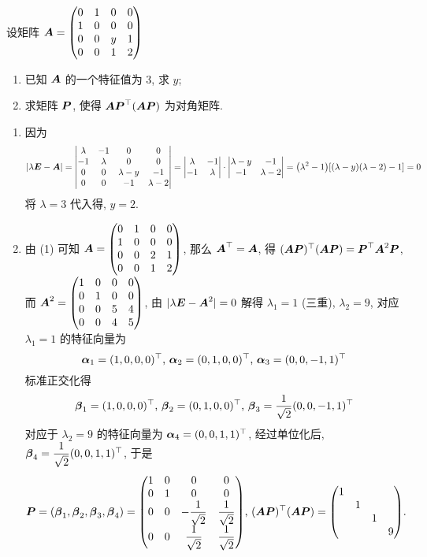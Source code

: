 \begin{example}
    设矩阵 $\vb*{A}=\mqty(0&1&0&0\\1&0&0&0\\0&0&y&1\\0&0&1&2)$
    \begin{enumerate}[label=(\arabic{*})]
        \item 已知 $\vb*{A}$ 的一个特征值为 3, 求 $y$;
        \item 求矩阵 $\vb*{P}$, 使得 $\vb*{AP}^{\top}(\vb*{AP})$ 为对角矩阵.
    \end{enumerate}
\end{example}
\begin{solution}
    \begin{enumerate}[label=(\arabic{*})]
        \item 因为 $$|\lambda\vb*{E}-\vb*{A}|=\mqty|\lambda&-1&0&0\\-1&\lambda&0&0\\0&0&\lambda-y&-1\\0&0&-1&\lambda-2|=\mqty|\lambda&-1\\-1&\lambda|\cdot\mqty|\lambda-y&-1\\-1&\lambda-2|=\qty(\lambda^2-1)[(\lambda-y)(\lambda-2)-1]=0$$
              将 $\lambda=3$ 代入得, $y=2$.
        \item 由 (1) 可知 $\vb*{A}=\mqty(0&1&0&0\\1&0&0&0\\0&0&2&1\\0&0&1&2)$, 那么 $\vb*{A}^\top=\vb*{A}$, 得 $(\vb*{AP})^\top(\vb*{AP})=\vb*{P}^\top\vb*{A}^2\vb*{P}$, 
              而 $\vb*{A}^2=\mqty(1&0&0&0\\0&1&0&0\\0&0&5&4\\0&0&4&5)$, 由 $|\lambda\vb*{E}-\vb*{A}^2|=0$ 解得 $\lambda_1=1$ (三重), $\lambda_2=9$, 对应 $\lambda_1=1$ 的特征向量为
              $$\vb*{\alpha}_1=(1,0,0,0)^\top\text{, }\vb*{\alpha}_2=(0,1,0,0)^\top\text{, }\vb*{\alpha}_3=(0,0,-1,1)^\top$$
              标准正交化得 $$\vb*{\beta}_1=(1,0,0,0)^\top\text{, }\vb*{\beta}_2=(0,1,0,0)^\top\text{, }\vb*{\beta}_3=\dfrac{1}{\sqrt{2}}(0,0,-1,1)^\top$$
              对应于 $\lambda_2=9$ 的特征向量为 $\vb*{\alpha}_4=(0,0,1,1)^\top$, 经过单位化后, $\vb*{\beta}_4=\dfrac{1}{\sqrt{2}}(0,0,1,1)^\top$, 于是
              $$\vb*{P}=(\vb*{\beta}_1,\vb*{\beta}_2,\vb*{\beta}_3,\vb*{\beta}_4)=\mqty(1&0&0&0\\0&1&0&0\\0&0&-\dfrac{1}{\sqrt{2}}&\dfrac{1}{\sqrt{2}}\\[6pt]0&0&\dfrac{1}{\sqrt{2}}&\dfrac{1}{\sqrt{2}})\text{, }(\vb*{AP})^\top(\vb*{AP})=\mqty(\dmat{1,1,1,9}).$$
    \end{enumerate}
\end{solution}

